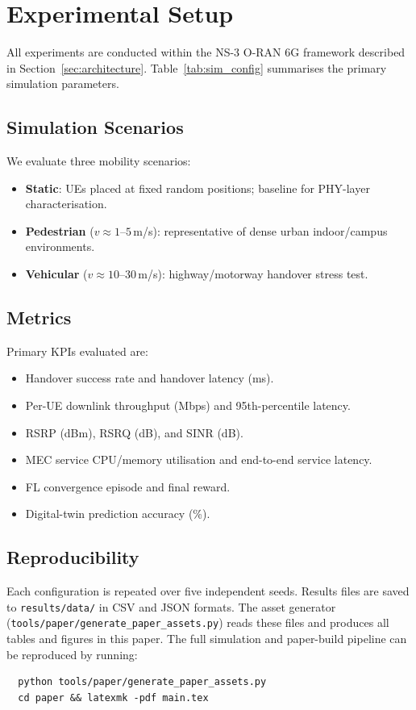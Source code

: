 \section{Experimental Setup}
\label{sec:setup}

All experiments are conducted within the NS-3 O-RAN 6G framework described
in Section~\ref{sec:architecture}.
Table~\ref{tab:sim_config} summarises the primary simulation parameters.



\subsection{Simulation Scenarios}
We evaluate three mobility scenarios:
\begin{itemize}
  \item \textbf{Static}: UEs placed at fixed random positions; baseline
        for PHY-layer characterisation.
  \item \textbf{Pedestrian} ($v \approx 1$--$5$\,m/s): representative of
        dense urban indoor/campus environments.
  \item \textbf{Vehicular} ($v \approx 10$--$30$\,m/s): highway/motorway
        handover stress test.
\end{itemize}

\subsection{Metrics}
Primary KPIs evaluated are:
\begin{itemize}
  \item Handover success rate and handover latency (ms).
  \item Per-UE downlink throughput (Mbps) and 95th-percentile latency.
  \item RSRP (dBm), RSRQ (dB), and SINR (dB).
  \item MEC service CPU/memory utilisation and end-to-end service latency.
  \item FL convergence episode and final reward.
  \item Digital-twin prediction accuracy (\%).
\end{itemize}

\subsection{Reproducibility}
Each configuration is repeated over five independent seeds.
Results files are saved to \texttt{results/data/} in CSV and JSON formats.
The asset generator (\texttt{tools/paper/generate\_paper\_assets.py}) reads
these files and produces all tables and figures in this paper.
The full simulation and paper-build pipeline can be reproduced by running:
\begin{verbatim}
  python tools/paper/generate_paper_assets.py
  cd paper && latexmk -pdf main.tex
\end{verbatim}
